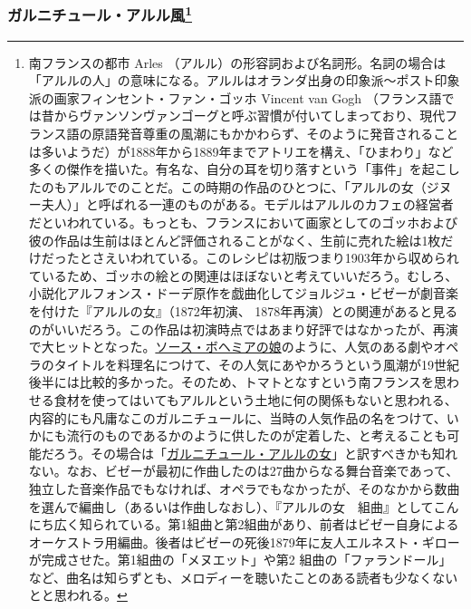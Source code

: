 \begin{recette}
{\subsubsection[ガルニチュール・アルル風]{\texorpdfstring{ガルニチュール・アルル風\footnote{南フランスの都市
  Arles
  （アルル）の形容詞および名詞形。名詞の場合は「アルルの人」の意味になる。アルルはオランダ出身の印象派〜ポスト印象派の画家フィンセント・ファン・ゴッホ
  Vincent van Gogh
  （フランス語では昔からヴァンソンヴァンゴーグと呼ぶ習慣が付いてしまっており、現代フランス語の原語発音尊重の風潮にもかかわらず、そのように発音されることは多いようだ）が1888年から1889年までアトリエを構え、「ひまわり」など多くの傑作を描いた。有名な、自分の耳を切り落すという「事件」を起こしたのもアルルでのことだ。この時期の作品のひとつに、「アルルの女（ジヌー夫人）」と呼ばれる一連のものがある。モデルはアルルのカフェの経営者だといわれている。もっとも、フランスにおいて画家としてのゴッホおよび彼の作品は生前はほとんど評価されることがなく、生前に売れた絵は1枚だけだったとさえいわれている。このレシピは初版つまり1903年から収められているため、ゴッホの絵との関連はほぼないと考えていいだろう。むしろ、小説化アルフォンス・ドーデ原作を戯曲化してジョルジュ・ビゼーが劇音楽を付けた『アルルの女』（1872年初演、
  1878年再演）との関連があると見るのがいいだろう。この作品は初演時点ではあまり好評ではなかったが、再演で大ヒットとなった。\protect\hyperlink{sauce-bohemienne}{ソース・ボヘミアの娘}のように、人気のある劇やオペラのタイトルを料理名につけて、その人気にあやかろうという風潮が19世紀後半には比較的多かった。そのため、トマトとなすという南フランスを思わせる食材を使ってはいてもアルルという土地に何の関係もないと思われる、内容的にも凡庸なこのガルニチュールに、当時の人気作品の名をつけて、いかにも流行のものであるかのように供したのが定着した、と考えることも可能だろう。その場合は「\ul{ガルニチュール・アルルの女}」と訳すべきかも知れない。なお、ビゼーが最初に作曲したのは27曲からなる舞台音楽であって、独立した音楽作品でもなければ、オペラでもなかったが、そのなかから数曲を選んで編曲し（あるいは作曲しなおし）、『アルルの女　組曲』としてこんにち広く知られている。第1組曲と第2組曲があり、前者はビゼー自身によるオーケストラ用編曲。後者はビゼーの死後1879年に友人エルネスト・ギローが完成させた。第1組曲の「メヌエット」や第2
  組曲の「ファランドール」など、曲名は知らずとも、メロディーを聴いたことのある読者も少なくないとと思われる。}}{ガルニチュール・アルル風}}\label{garniture-arlesienne}}




\end{recette}
